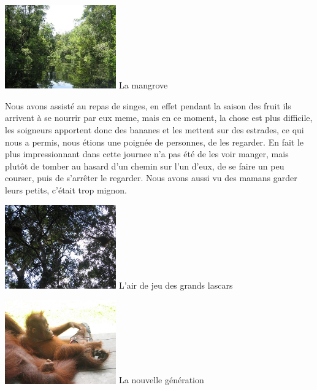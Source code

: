 \begin{multicols}{2}
\hspace*{-0.65cm}
\includegraphics[width=4.8cm]{articles/Borneo/1210332087kPql.jpg}
La mangrove

Nous avons assisté au repas de singes, en effet pendant la saison des fruit ils arrivent à se nourrir par eux meme, mais en ce moment, la chose est plus difficile, les soigneurs apportent donc des bananes et les mettent sur des estrades, ce qui nous a permis, nous étions une poignée de personnes, de les regarder. En fait le plus impressionnant dans cette journee n'a pas été de les voir manger, mais plutôt de tomber au hasard d'un chemin sur l'un d'eux, de se faire un peu courser, puis de s'arrêter le regarder. Nous avons aussi vu des mamans garder leurs petits, c'était trop mignon.

\hspace*{-0.65cm}
\includegraphics[width=4.8cm]{articles/Borneo/1210332096AngR.jpg}
L'air de jeu des grands lascars

\hspace*{-0.65cm}
\includegraphics[width=4.8cm]{articles/Borneo/1210332100Imld.jpg}
La nouvelle génération


\end{multicols}



